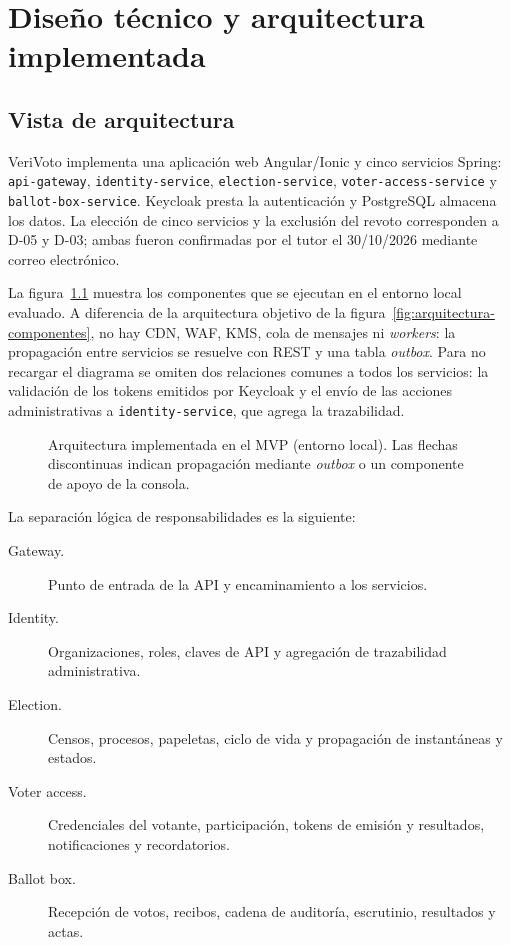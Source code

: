 \chapter{Diseño técnico y arquitectura implementada}
\label{cap:diseno-tecnico}

\section{Vista de arquitectura}
VeriVoto implementa una aplicación web Angular/Ionic y cinco servicios
Spring: \texttt{api-gateway}, \texttt{identity-service},
\texttt{election-service}, \texttt{voter-access-service} y
\texttt{ballot-box-service}. Keycloak presta la autenticación y PostgreSQL
almacena los datos. La elección de cinco servicios y la exclusión del revoto
corresponden a D-05 y D-03; ambas fueron confirmadas por el tutor el
30/10/2026 mediante correo electrónico.

La figura~\ref{fig:arquitectura-implementada} muestra los componentes que se
ejecutan en el entorno local evaluado. A diferencia de la arquitectura
objetivo de la figura~\ref{fig:arquitectura-componentes}, no hay CDN, WAF,
KMS, cola de mensajes ni \emph{workers}: la propagación entre servicios se
resuelve con REST y una tabla \emph{outbox}. Para no recargar el diagrama se
omiten dos relaciones comunes a todos los servicios: la validación de los
tokens emitidos por Keycloak y el envío de las acciones administrativas a
\texttt{identity-service}, que agrega la trazabilidad.

\begin{figure}[htbp]
  \centering
  \resizebox{0.98\textwidth}{!}{}
  \caption{Arquitectura implementada en el MVP (entorno local). Las flechas discontinuas indican propagación mediante \emph{outbox} o un componente de apoyo de la consola.}
  \label{fig:arquitectura-implementada}
\end{figure}

La separación lógica de responsabilidades es la siguiente:
\begin{description}
 \item[Gateway.] Punto de entrada de la API y encaminamiento a los servicios.
 \item[Identity.] Organizaciones, roles, claves de API y agregación de
 trazabilidad administrativa.
 \item[Election.] Censos, procesos, papeletas, ciclo de vida y propagación de
 instantáneas y estados.
 \item[Voter access.] Credenciales del votante, participación, tokens de
 emisión y resultados, notificaciones y recordatorios.
 \item[Ballot box.] Recepción de votos, recibos, cadena de auditoría,
 escrutinio, resultados y actas.
\end{description}

